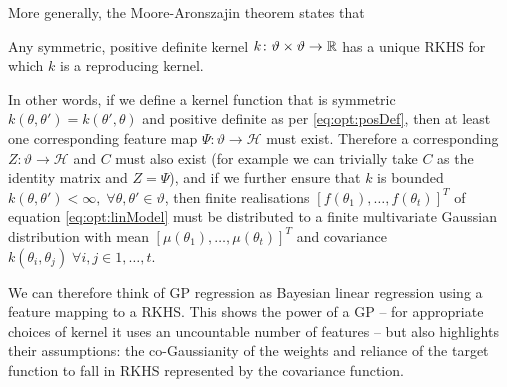 More generally, the Moore-Aronszajin theorem \citep{aronszajn1950theory} states that
\begin{theorem}
	\label{the:opt:Moore-Aronszajin}
	Any symmetric, positive definite kernel $k \colon \vartheta \times \vartheta \rightarrow \mathbb{R}$ has a unique RKHS for which $k$ is a reproducing kernel.
\end{theorem}
\noindent In other words, if we define a kernel function that is symmetric $k\left(\theta,\theta'\right) = k\left(\theta',\theta\right)$ and positive definite as per \eqref{eq:opt:posDef}, then at least one corresponding feature map $\Psi \colon \vartheta \rightarrow \mathcal{H}$ must exist.  Therefore a corresponding $Z \colon \vartheta \rightarrow \mathcal{H}$ and $C$ must also exist (for example we can trivially take $C$ as the identity matrix and $Z = \Psi$), and if we further ensure that $k$ is bounded $k\left(\theta,\theta'\right) < \infty, \; \forall \theta, \theta' \in \vartheta$, then finite realisations  $\left[f\left(\theta_1\right),\dots,f\left(\theta_t\right)\right]^T$ of equation \eqref{eq:opt:linModel} must be distributed to a finite multivariate Gaussian distribution with mean  $\left[\mu\left(\theta_1\right),\dots,\mu\left(\theta_t\right)\right]^T$ and covariance $k\left(\theta_i,\theta_j\right) \; \forall i,j \in {1,\dots,t}$.  
%
%

We can therefore think of GP regression as Bayesian linear regression using
a feature mapping to a RKHS.  This shows the power of a GP -- for appropriate
choices of kernel it uses an uncountable number of features -- but also highlights
their assumptions: the co-Gaussianity of the weights and reliance of the target
function to fall in RKHS represented by the covariance function.